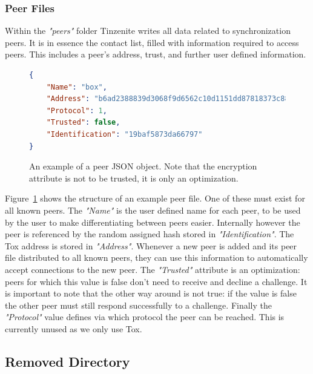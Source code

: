 \subsubsection{Peer Files}
\label{subs:Peer Files}

Within the \textit{"peers"} folder Tinzenite writes all data related to synchronization peers.
It is in essence the contact list, filled with information required to access peers.
This includes a peer's address, trust, and further user defined information.

\begin{figure}[htp]
    \begin{lstlisting}[language=json,firstnumber=0]
{
    "Name": "box",
    "Address": "b6ad2388839d3068f9d6562c10d1151dd87818373c88cf9aad829144c63aac36",
    "Protocol": 1,
    "Trusted": false,
    "Identification": "19baf5873da66797"
}
    \end{lstlisting}
\caption[Peer JSON Object]{An example of a peer JSON object. Note that the encryption attribute is not to be trusted, it is only an optimization.}
\label{json:peer_object}
\end{figure}

Figure~\ref{json:peer_object} shows the structure of an example peer file.
One of these must exist for all known peers.
The \textit{"Name"} is the user defined name for each peer, to be used by the user to make differentiating between peers easier.
Internally however the peer is referenced by the random assigned hash stored in \textit{"Identification"}.
The Tox address is stored in \textit{"Address"}.
Whenever a new peer is added and its peer file distributed to all known peers, they can use this information to automatically accept connections to the new peer.
The \textit{"Trusted"} attribute is an optimization: peers for which this value is false don't need to receive and decline a challenge.
It is important to note that the other way around is not true: if the value is false the other peer must still respond successfully to a challenge.
Finally the \textit{"Protocol"} value defines via which protocol the peer can be reached.
This is currently unused as we only use Tox.

\subsection{Removed Directory}
\label{sub:Removed Directory}

